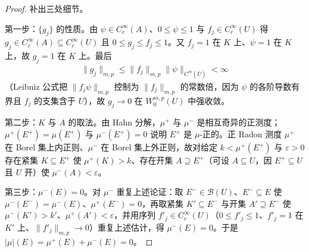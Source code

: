 \documentclass[../../main.tex]{subfiles}%
\begin{document}
\begin{proof}
补出三处细节。

第一步：$\{g_j\}$ 的性质。由 $\psi\in C^\infty_c(A)$、$0\leqslant\psi\leqslant1$ 与 $f_j\in C^\infty_c(U)$ 得 $g_j\in C^\infty_c(A)\subseteq C^\infty_c(U)$ 且 $0\leqslant g_j\leqslant f_j\leqslant1$。又 $f_j=1$ 在 $K$ 上、$\psi=1$ 在 $K$ 上，故 $g_j=1$ 在 $K$ 上。最后
\begin{align*}
\|g_j\|_{m,p}\leqslant\|f_j\|_{m,p}\|\psi\|_{C^{m}(\overline U)}<\infty
\end{align*}
（Leibniz 公式把 $\|f_j\psi\|_{m,p}$ 控制为 $\|f_j\|_{m,p}$ 的常数倍，因为 $\psi$ 的各阶导数有界且 $f_j$ 的支集含于 $U$），故 $g_j\to0$ 在 $W^{m,p}_0(U)$ 中强收敛。

第二步：$K$ 与 $A$ 的取法。由 Hahn 分解，$\mu^+$ 与 $\mu^-$ 是相互奇异的正测度；$\mu^+(E^+)=\mu(E^+)$ 与 $\mu^-(E^+)=0$ 说明 $E^+$ 是 $\mu$-正的。正 Radon 测度 $\mu^+$ 在 Borel 集上内正则、$\mu^-$ 在 Borel 集上外正则，故对给定 $k<\mu^+(E^+)$ 与 $\varepsilon>0$ 存在紧集 $K\subseteq E^+$ 使 $\mu^+(K)>k$、存在开集 $A\supseteq E^+$（可设 $A\subseteq U$，因 $E^+\subseteq U$ 且 $U$ 开）使 $\mu^-(A)<\varepsilon$。

第三步：$\mu^-(E)=0$。对 $\mu^-$ 重复上述论证：取 $E^-\in\mathcal{B}(U)$、$E^-\subseteq E$ 使 $\mu^-(E^-)=\mu^-(E)$、$\mu^+(E^-)=0$，再取紧集 $K'\subseteq E^-$ 与开集 $A'\supseteq E^-$ 使 $\mu^-(K')>k'$、$\mu^+(A')<\varepsilon$，并用序列 $f'_j\in C^\infty_c(U)$（$0\leqslant f'_j\leqslant1$、$f'_j=1$ 在 $K'$ 上、$\|f'_j\|_{m,p}\to0$）重复上述估计，得 $\mu^-(E)=0$。于是 $|\mu|(E)=\mu^+(E)+\mu^-(E)=0$。
\end{proof}
\end{document}
